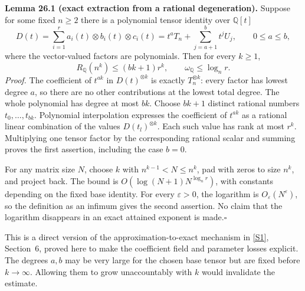 \documentclass[11pt,a4paper]{article}
\newcommand{\Q}{\mathbb{Q}}
\newcommand{\sref}[2]{\hyperlink{source:#1:#2}{[S#2]}}
\numberwithin{equation}{section}
\begin{document}
\textbf{Lemma 26.1 (exact extraction from a rational degeneration).}
Suppose for some fixed $n\ge2$ there is a polynomial tensor identity over
$\Q[t]$
\begin{equation}\label{r26:degeneration}
 D(t)=\sum_{i=1}^{r}a_i(t)\otimes b_i(t)\otimes c_i(t)
          =t^aT_n+\sum_{j=a+1}^{b}t^jU_j,
          \qquad 0\le a\le b,
\end{equation}
where the vector-valued factors are polynomials. Then for every $k\ge1$,
\begin{equation}\label{r26:exact}
       R_{\Q}(n^k)\le(bk+1)r^k,
       \qquad \omega_{\Q}\le\log_n r.
\end{equation}
\emph{Proof.} The coefficient of $t^{ak}$ in $D(t)^{\otimes k}$ is
exactly $T_n^{\otimes k}$: every factor has lowest degree $a$, so there
are no other contributions at the lowest total degree. The whole
polynomial has degree at most $bk$. Choose $bk+1$ distinct rational
numbers $t_0,\ldots,t_{bk}$. Polynomial interpolation expresses the
coefficient of $t^{ak}$ as a rational linear combination of the values
$D(t_l)^{\otimes k}$. Each such value has rank at most $r^k$.
Multiplying one tensor factor by the corresponding rational scalar and
summing proves the first assertion, including the case $b=0$.

For any matrix size $N$, choose $k$ with $n^{k-1}<N\le n^k$, pad with
zeros to size $n^k$, and project back. The bound is
$O(\log(N+1)N^{\log_n r})$, with constants depending on the fixed base
identity. For every $\varepsilon>0$, the logarithm is
$O_\varepsilon(N^\varepsilon)$, so the definition as an infimum gives
the second assertion. No claim that the logarithm disappears in an
exact attained exponent is made.\hfill$\square$

This is a direct version of the approximation-to-exact mechanism in
\sref{26}{1}, Section~6, proved here to make the coefficient field and
parameter losses explicit. The degrees $a,b$ may be very large for the
chosen base tensor but are fixed before $k\to\infty$. Allowing them to
grow unaccountably with $k$ would invalidate the estimate.
\end{document}
